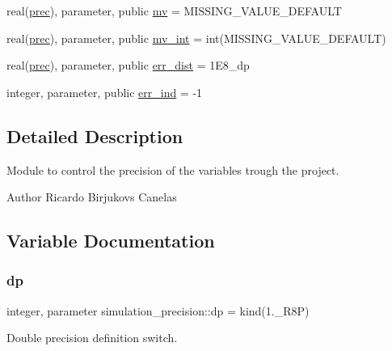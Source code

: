 \begin{DoxyCompactItemize}
real(\hyperlink{namespacesimulation__precision_a6d3bcd3b4ff2cfb92ec9fe36ecad405b}{prec}), parameter, public \hyperlink{namespacesimulation__precision_a4416a112b4fc53848f9f18fe5e9003db}{mv} = M\+I\+S\+S\+I\+N\+G\+\_\+\+V\+A\+L\+U\+E\+\_\+\+D\+E\+F\+A\+U\+LT
\item 
real(\hyperlink{namespacesimulation__precision_a6d3bcd3b4ff2cfb92ec9fe36ecad405b}{prec}), parameter, public \hyperlink{namespacesimulation__precision_ae23a853ee1499839ea702b3c01e443fc}{mv\+\_\+int} = int(M\+I\+S\+S\+I\+N\+G\+\_\+\+V\+A\+L\+U\+E\+\_\+\+D\+E\+F\+A\+U\+LT)
\item 
real(\hyperlink{namespacesimulation__precision_a6d3bcd3b4ff2cfb92ec9fe36ecad405b}{prec}), parameter, public \hyperlink{namespacesimulation__precision_acb6a32a47c43de36b53bb8033aa2738e}{err\+\_\+dist} = 1\+E8\+\_\+dp
\item 
integer, parameter, public \hyperlink{namespacesimulation__precision_a531d4e8c47b468cf4212393a5b84c7c8}{err\+\_\+ind} = -\/1
\end{DoxyCompactItemize}


\subsection{Detailed Description}
Module to control the precision of the variables trough the project. 

\begin{DoxyAuthor}{Author}
Ricardo Birjukovs Canelas 
\end{DoxyAuthor}


\subsection{Variable Documentation}
\mbox{\label{namespacesimulation__precision_af01fc62f503e0ff9a95c9ee2960c9a7f}} 
\subsubsection{\texorpdfstring{dp}{dp}}
{\footnotesize\ttfamily integer, parameter simulation\+\_\+precision\+::dp = kind(1.\+\_\+\+R8P)\hspace{0.3cm}{\ttfamily [private]}}



Double precision definition switch. 

